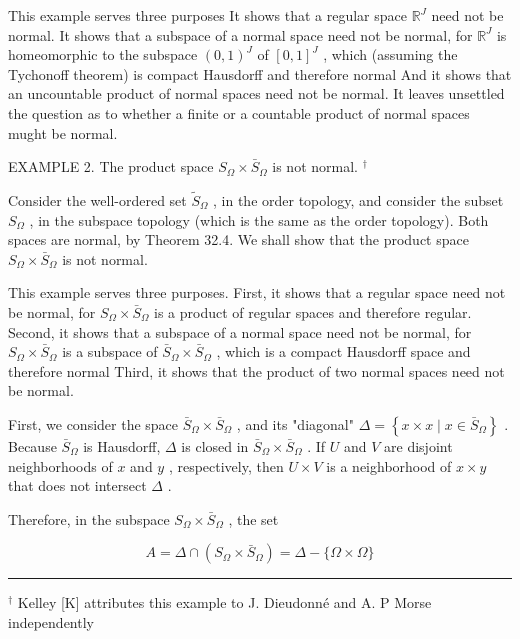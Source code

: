 \documentclass[10pt]{article}
\newcommand{\HRule}{\begin{center}\rule{0.9\linewidth}{0.2mm}\end{center}}
\begin{document}
This example serves three purposes It shows that a regular space \({\mathbb{R}}^{J}\) need not be normal. It shows that a subspace of a normal space need not be normal, for \({\mathbb{R}}^{J}\) is homeomorphic to the subspace \({\left( 0,1\right) }^{J}\) of \({\left\lbrack  0,1\right\rbrack  }^{J}\) , which (assuming the Tychonoff theorem) is compact Hausdorff and therefore normal And it shows that an uncountable product of normal spaces need not be normal. It leaves unsettled the question as to whether a finite or a countable product of normal spaces mught be normal.

EXAMPLE 2. The product space \({S}_{\Omega } \times  {\bar{S}}_{\Omega }\) is not normal. \({}^{ \dagger  }\)

Consider the well-ordered set \({\widetilde{S}}_{\Omega }\) , in the order topology, and consider the subset \({S}_{\Omega }\) , in the subspace topology (which is the same as the order topology). Both spaces are normal, by Theorem 32.4. We shall show that the product space \({S}_{\Omega } \times  {\bar{S}}_{\Omega }\) is not normal.

This example serves three purposes. First, it shows that a regular space need not be normal, for \({S}_{\Omega } \times  {\bar{S}}_{\Omega }\) is a product of regular spaces and therefore regular. Second, it shows that a subspace of a normal space need not be normal, for \({S}_{\Omega } \times  {\bar{S}}_{\Omega }\) is a subspace of \({\bar{S}}_{\Omega } \times  {\bar{S}}_{\Omega }\) , which is a compact Hausdorff space and therefore normal Third, it shows that the product of two normal spaces need not be normal.

First, we consider the space \({\bar{S}}_{\Omega } \times  {\bar{S}}_{\Omega }\) , and its "diagonal" \(\Delta  = \left\{  {x \times  x \mid  x \in  {\bar{S}}_{\Omega }}\right\}\) . Because \({\bar{S}}_{\Omega }\) is Hausdorff, \(\Delta\) is closed in \({\bar{S}}_{\Omega } \times  {\bar{S}}_{\Omega }\) . If \(U\) and \(V\) are disjoint neighborhoods of \(x\) and \(y\) , respectively, then \(U \times  V\) is a neighborhood of \(x \times  y\) that does not intersect \(\Delta\) .

Therefore, in the subspace \({S}_{\Omega } \times  {\bar{S}}_{\Omega }\) , the set

\[
A = \Delta  \cap  \left( {{S}_{\Omega } \times  {\bar{S}}_{\Omega }}\right)  = \Delta  - \{ \Omega  \times  \Omega \}
\]

\HRule

\({}^{ \dagger  }\) Kelley [K] attributes this example to J. Dieudonné and A. P Morse independently
\end{document}
